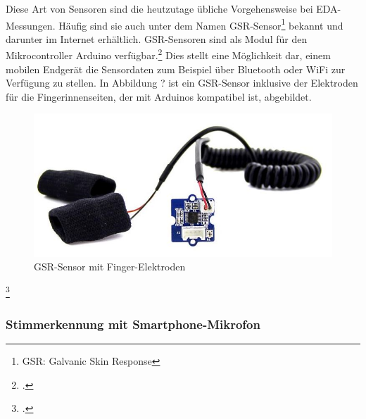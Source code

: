 Diese Art von Sensoren sind die heutzutage übliche Vorgehensweise bei EDA-Messungen. Häufig sind sie auch unter dem Namen GSR-Sensor\footnote{GSR: Galvanic Skin Response} bekannt und darunter im Internet erhältlich. GSR-Sensoren sind als Modul für den Mikrocontroller Arduino verfügbar.\footcite[beispielsweise:][]{Gro18} Dies stellt eine Möglichkeit dar, einem mobilen Endgerät die Sensordaten zum Beispiel über Bluetooth oder WiFi zur Verfügung zu stellen. In Abbildung ? ist ein GSR-Sensor inklusive der Elektroden für die Fingerinnenseiten, der mit Arduinos kompatibel ist, abgebildet.
\begin{figure}[h]
	\centering
	\includegraphics[width=15cm]{Bilder/sensor.jpg}
	\caption[GSR-Sensor mit Finger-Elektroden]{GSR-Sensor mit Finger-Elektroden\footnotemark}
\end{figure}%
\footcitetext{Gro18}
\subsubsection{Stimmerkennung mit Smartphone-Mikrofon}

